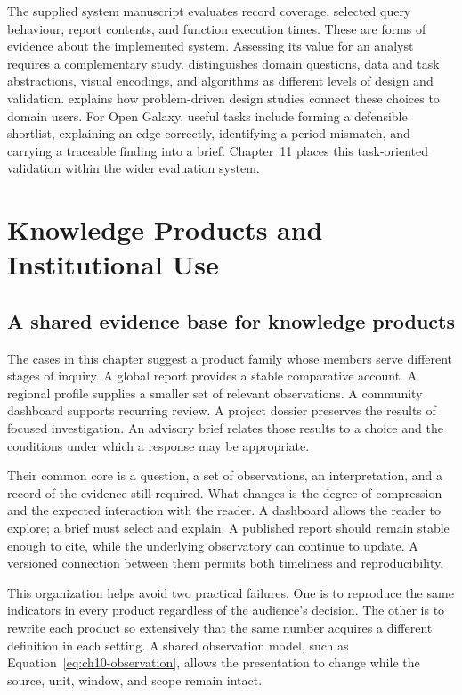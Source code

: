The supplied system manuscript evaluates record coverage, selected query behaviour, report contents, and function execution times. These are forms of evidence about the implemented system. Assessing its value for an analyst requires a complementary study. \citet{munzner2009} distinguishes domain questions, data and task abstractions, visual encodings, and algorithms as different levels of design and validation. \citet{sedlmair2012} explains how problem-driven design studies connect these choices to domain users. For Open Galaxy, useful tasks include forming a defensible shortlist, explaining an edge correctly, identifying a period mismatch, and carrying a traceable finding into a brief. Chapter~11 places this task-oriented validation within the wider evaluation system.

\section{Knowledge Products and Institutional Use}
\label{sec:ch10-products}

\subsection{A shared evidence base for knowledge products}
The cases in this chapter suggest a product family whose members serve different stages of inquiry. A global report provides a stable comparative account. A regional profile supplies a smaller set of relevant observations. A community dashboard supports recurring review. A project dossier preserves the results of focused investigation. An advisory brief relates those results to a choice and the conditions under which a response may be appropriate.

Their common core is a question, a set of observations, an interpretation, and a record of the evidence still required. What changes is the degree of compression and the expected interaction with the reader. A dashboard allows the reader to explore; a brief must select and explain. A published report should remain stable enough to cite, while the underlying observatory can continue to update. A versioned connection between them permits both timeliness and reproducibility.

This organization helps avoid two practical failures. One is to reproduce the same indicators in every product regardless of the audience's decision. The other is to rewrite each product so extensively that the same number acquires a different definition in each setting. A shared observation model, such as Equation~\ref{eq:ch10-observation}, allows the presentation to change while the source, unit, window, and scope remain intact.

